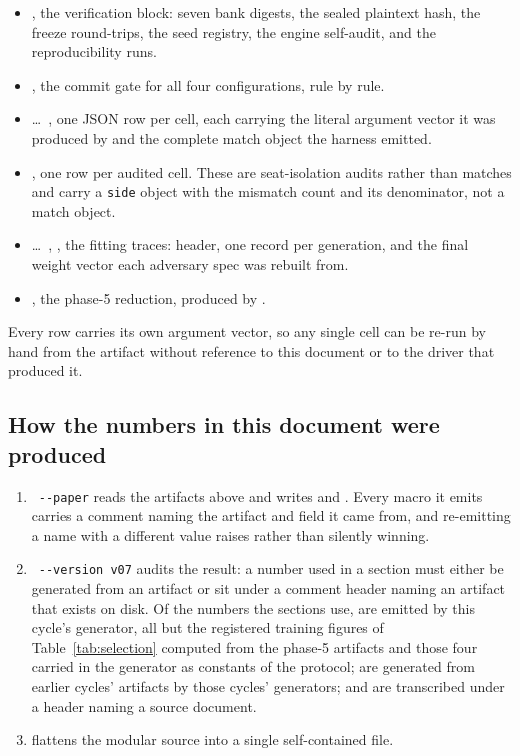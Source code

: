 \begin{itemize}
\item {}, the verification block: seven bank digests, the sealed plaintext hash,
  the freeze round-trips, the seed registry, the engine self-audit, and the reproducibility runs.
\item {}, the commit gate for all four configurations, rule by rule.
\item {} \ldots\ , one JSON row per cell, each carrying
  the literal argument vector it was produced by and the complete match object the harness emitted.
\item {}, one row per audited cell. These are seat-isolation audits rather
  than matches and carry a \texttt{side} object with the mismatch count and its denominator, not a
  match object.
\item {} \ldots\ , , the
  fitting traces: header, one record per generation, and the final weight vector each adversary spec
  was rebuilt from.
\item {}, the phase-5 reduction, produced by .
\end{itemize}

Every row carries its own argument vector, so any single cell can be re-run by hand from the artifact
without reference to this document or to the driver that produced it.

\subsection*{How the numbers in this document were produced}

\begin{enumerate}
\item {}~\texttt{-{}-paper} reads the artifacts above and writes
   and . Every macro it
  emits carries a comment naming the artifact and field it came from, and re-emitting a name with a
  different value raises rather than silently winning.
\item {}~\texttt{-{}-version v07} audits the result: a number used in a section
  must either be generated from an artifact or sit under a comment header naming an artifact that
  exists on disk. Of the numbers the sections use, \vsevenProvGenerated{} are emitted by this
  cycle's generator, all but the registered training figures of Table~\ref{tab:selection} computed
  from the phase-5 artifacts and those four carried in the generator as constants of the protocol;
  \vsevenProvInherited{} are generated from earlier cycles' artifacts by those cycles' generators;
  and \vsevenProvTranscribed{} are transcribed under a header naming a source document.
\item {} flattens the modular source into a single self-contained file.
\end{enumerate}

